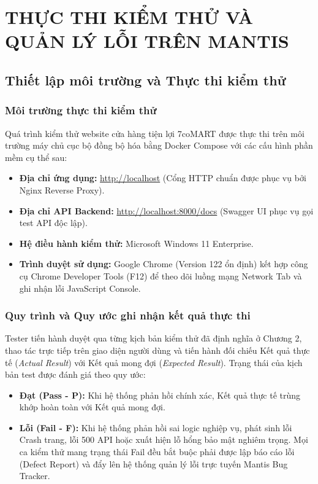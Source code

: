 \chapter{THỰC THI KIỂM THỬ VÀ QUẢN LÝ LỖI TRÊN MANTIS}

\section{Thiết lập môi trường và Thực thi kiểm thử}

\subsection{Môi trường thực thi kiểm thử}
Quá trình kiểm thử website cửa hàng tiện lợi 7coMART được thực thi trên môi trường máy chủ cục bộ đồng bộ hóa bằng Docker Compose với các cấu hình phần mềm cụ thể sau:
\begin{itemize}
    \item \textbf{Địa chỉ ứng dụng:} \url{http://localhost} (Cổng HTTP chuẩn được phục vụ bởi Nginx Reverse Proxy).
    \item \textbf{Địa chỉ API Backend:} \url{http://localhost:8000/docs} (Swagger UI phục vụ gọi test API độc lập).
    \item \textbf{Hệ điều hành kiểm thử:} Microsoft Windows 11 Enterprise.
    \item \textbf{Trình duyệt sử dụng:} Google Chrome (Version 122 ổn định) kết hợp công cụ Chrome Developer Tools (F12) để theo dõi luồng mạng Network Tab và ghi nhận lỗi JavaScript Console.
\end{itemize}

\subsection{Quy trình và Quy ước ghi nhận kết quả thực thi}
Tester tiến hành duyệt qua từng kịch bản kiểm thử đã định nghĩa ở Chương 2, thao tác trực tiếp trên giao diện người dùng và tiến hành đối chiếu Kết quả thực tế (\textit{Actual Result}) với Kết quả mong đợi (\textit{Expected Result}). Trạng thái của kịch bản test được đánh giá theo quy ước:
\begin{itemize}
    \item \textbf{Đạt (Pass - P):} Khi hệ thống phản hồi chính xác, Kết quả thực tế trùng khớp hoàn toàn với Kết quả mong đợi.
    \item \textbf{Lỗi (Fail - F):} Khi hệ thống phản hồi sai logic nghiệp vụ, phát sinh lỗi Crash trang, lỗi 500 API hoặc xuất hiện lỗ hổng bảo mật nghiêm trọng. Mọi ca kiểm thử mang trạng thái Fail đều bắt buộc phải được lập báo cáo lỗi (Defect Report) và đẩy lên hệ thống quản lý lỗi trực tuyến Mantis Bug Tracker.
\end{itemize}

